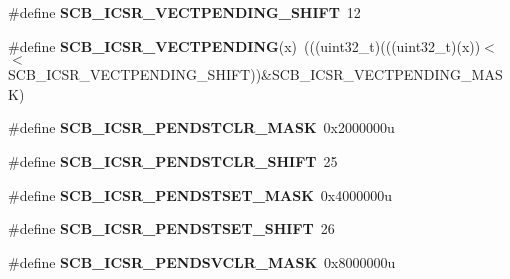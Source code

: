\begin{DoxyCompactItemize}
\item 
\mbox{\label{group___s_c_b___register___masks_ga345baf83f90de34c6c67edb24968fcc7}} 
\#define {\bfseries S\+C\+B\+\_\+\+I\+C\+S\+R\+\_\+\+V\+E\+C\+T\+P\+E\+N\+D\+I\+N\+G\+\_\+\+S\+H\+I\+FT}~12
\item 
\mbox{\label{group___s_c_b___register___masks_ga988d490e8d0de25eba6c8622d13bc725}} 
\#define {\bfseries S\+C\+B\+\_\+\+I\+C\+S\+R\+\_\+\+V\+E\+C\+T\+P\+E\+N\+D\+I\+NG}(x)~(((uint32\+\_\+t)(((uint32\+\_\+t)(x))$<$$<$S\+C\+B\+\_\+\+I\+C\+S\+R\+\_\+\+V\+E\+C\+T\+P\+E\+N\+D\+I\+N\+G\+\_\+\+S\+H\+I\+FT))\&S\+C\+B\+\_\+\+I\+C\+S\+R\+\_\+\+V\+E\+C\+T\+P\+E\+N\+D\+I\+N\+G\+\_\+\+M\+A\+SK)
\item 
\mbox{\label{group___s_c_b___register___masks_ga7dc9d2d6061166d9cfa66904477acd2e}} 
\#define {\bfseries S\+C\+B\+\_\+\+I\+C\+S\+R\+\_\+\+P\+E\+N\+D\+S\+T\+C\+L\+R\+\_\+\+M\+A\+SK}~0x2000000u
\item 
\mbox{\label{group___s_c_b___register___masks_ga4681662981a7a9ce4c39ba42e79bdf36}} 
\#define {\bfseries S\+C\+B\+\_\+\+I\+C\+S\+R\+\_\+\+P\+E\+N\+D\+S\+T\+C\+L\+R\+\_\+\+S\+H\+I\+FT}~25
\item 
\mbox{\label{group___s_c_b___register___masks_gaec656bf7e4d2fdcacfe0ef3e16397a04}} 
\#define {\bfseries S\+C\+B\+\_\+\+I\+C\+S\+R\+\_\+\+P\+E\+N\+D\+S\+T\+S\+E\+T\+\_\+\+M\+A\+SK}~0x4000000u
\item 
\mbox{\label{group___s_c_b___register___masks_ga048d1683c88c61f80f5c80173bf5e981}} 
\#define {\bfseries S\+C\+B\+\_\+\+I\+C\+S\+R\+\_\+\+P\+E\+N\+D\+S\+T\+S\+E\+T\+\_\+\+S\+H\+I\+FT}~26
\item 
\mbox{\label{group___s_c_b___register___masks_ga12a45a6af09cbefd431d033d8411220e}} 
\#define {\bfseries S\+C\+B\+\_\+\+I\+C\+S\+R\+\_\+\+P\+E\+N\+D\+S\+V\+C\+L\+R\+\_\+\+M\+A\+SK}~0x8000000u
\item 
\mbox{\label{group___s_c_b___register___masks_gad7a5894ad98606b443ab6f1b52f2bc36}} 
$$
\end{DoxyCompactItemize}
